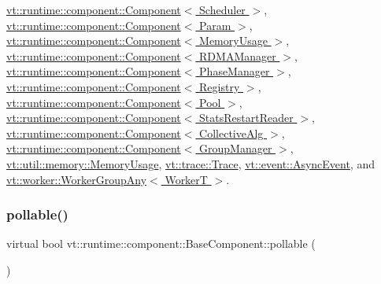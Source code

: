 \hyperlink{structvt_1_1runtime_1_1component_1_1_component_a7f07384d294e59796add9ce6be2d6410}{vt\+::runtime\+::component\+::\+Component$<$ Scheduler $>$}, \hyperlink{structvt_1_1runtime_1_1component_1_1_component_a7f07384d294e59796add9ce6be2d6410}{vt\+::runtime\+::component\+::\+Component$<$ Param $>$}, \hyperlink{structvt_1_1runtime_1_1component_1_1_component_a7f07384d294e59796add9ce6be2d6410}{vt\+::runtime\+::component\+::\+Component$<$ Memory\+Usage $>$}, \hyperlink{structvt_1_1runtime_1_1component_1_1_component_a7f07384d294e59796add9ce6be2d6410}{vt\+::runtime\+::component\+::\+Component$<$ R\+D\+M\+A\+Manager $>$}, \hyperlink{structvt_1_1runtime_1_1component_1_1_component_a7f07384d294e59796add9ce6be2d6410}{vt\+::runtime\+::component\+::\+Component$<$ Phase\+Manager $>$}, \hyperlink{structvt_1_1runtime_1_1component_1_1_component_a7f07384d294e59796add9ce6be2d6410}{vt\+::runtime\+::component\+::\+Component$<$ Registry $>$}, \hyperlink{structvt_1_1runtime_1_1component_1_1_component_a7f07384d294e59796add9ce6be2d6410}{vt\+::runtime\+::component\+::\+Component$<$ Pool $>$}, \hyperlink{structvt_1_1runtime_1_1component_1_1_component_a7f07384d294e59796add9ce6be2d6410}{vt\+::runtime\+::component\+::\+Component$<$ Stats\+Restart\+Reader $>$}, \hyperlink{structvt_1_1runtime_1_1component_1_1_component_a7f07384d294e59796add9ce6be2d6410}{vt\+::runtime\+::component\+::\+Component$<$ Collective\+Alg $>$}, \hyperlink{structvt_1_1runtime_1_1component_1_1_component_a7f07384d294e59796add9ce6be2d6410}{vt\+::runtime\+::component\+::\+Component$<$ Group\+Manager $>$}, \hyperlink{structvt_1_1util_1_1memory_1_1_memory_usage_add66c6cdabed24194310380c5a28951a}{vt\+::util\+::memory\+::\+Memory\+Usage}, \hyperlink{structvt_1_1trace_1_1_trace_a24019edd964c0a307008f8d6a0f1f825}{vt\+::trace\+::\+Trace}, \hyperlink{structvt_1_1event_1_1_async_event_ac8d9f977b1cca3f43a06d0e83bc88e3d}{vt\+::event\+::\+Async\+Event}, and \hyperlink{structvt_1_1worker_1_1_worker_group_any_ad8bb855b98bf26337ca13df2bff5fb95}{vt\+::worker\+::\+Worker\+Group\+Any$<$ Worker\+T $>$}.

\mbox{\label{structvt_1_1runtime_1_1component_1_1_base_component_ab651a49e6d4d3d8ca9e82a6b4b10af66}} 
\subsubsection{\texorpdfstring{pollable()}{pollable()}}
{\footnotesize\ttfamily virtual bool vt\+::runtime\+::component\+::\+Base\+Component\+::pollable (\begin{DoxyParamCaption}{ }\end{DoxyParamCaption})\hspace{0.3cm}{\ttfamily [pure virtual]}}



